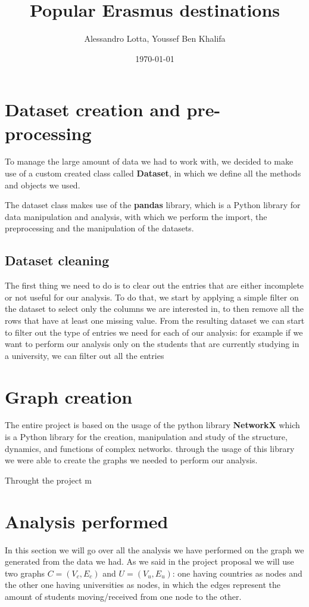 
\usepackage{hyperref}
\usepackage{xurl}
\usepackage{listings}
\title{Popular Erasmus destinations}
\author{Alessandro Lotta, Youssef Ben Khalifa}
\date{\today}

\maketitle \tableofcontents 
\newpage

\section{Dataset creation and pre-processing}
To manage the large amount of data we had to work with, we decided to make use of a custom created class called \textbf{Dataset}, in which we define all the 
methods and objects we used. 

The dataset class makes use of the \textbf{pandas} library, which is a Python library for data manipulation and analysis, with which 
we perform the import, the preprocessing and the manipulation of the datasets. 

\subsection*{Dataset cleaning}
The first thing we need to do is to clear out the entries that are either incomplete or not useful for our analysis. To do that, 
we start by applying a simple filter on the dataset to select only the columns we are interested in, to then remove all 
the rows that have at least one missing value. 
From the resulting dataset we can start to filter out the type of entries we need for each of our analysis: for example if we 
want to perform our analysis only on the students that are currently studying in a university, we can filter out all the entries
\section{Graph creation}
The entire project is based on the usage of the python library \textbf{NetworkX} which is a Python library for the creation, manipulation and study of the structure, dynamics, and functions of complex networks.
through the usage of this library we were able to create the graphs we needed to perform our analysis.

Throught the project m
\section{Analysis performed}
    In this section we will go over all the analysis we have performed on the graph we generated from the data we had.
    As we said in the project proposal we will use two graphs $C = (V_c, E_c)$ and $U = (V_u, E_u)$: 
    one having countries as nodes and the other one having universities as nodes, 
    in which the edges represent the amount of students moving/received from one node to the other.

